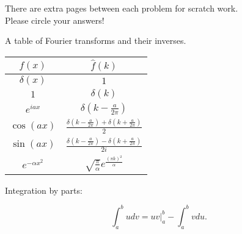 \documentclass[12pt]{amsbook}
\begin{document}
\vspace*{4cm}


\begin{center}\large{There are extra pages between each problem for scratch work.\\

Please circle your answers!}\end{center}

\newpage
\begin{center}\large{A table of Fourier transforms and their inverses.} \end{center}
\begin{table}[H]
        \centering
        \renewcommand{\arraystretch}{2}
        \begin{tabular}{c|c}
            $f(x)$ & $\hat{f}(k)$\\
            \hline
         	$\delta(x)$ & $1$\\
         	$1$ & $\delta(k)$\\
         	$e^{iax}$ & $\delta\left(k-\frac{a}{2\pi}\right)$\\
         	$\cos(ax)$ & $\frac{\delta\left(k-\frac{a}{2\pi}\right)+\delta\left(k+\frac{a}{2\pi}\right)}{2}$\\
     		$\sin(ax)$ & $\frac{\delta\left(k-\frac{a}{2\pi}\right)-\delta\left(k+\frac{a}{2\pi}\right)}{2i}$\\
     		$e^{-\alpha x^2}$ & $\sqrt{\frac{\pi}{\alpha}} e^{\frac{(\pi k)^2}{\alpha}}$
        \end{tabular}
        \label{tab:fourier_transform}
    \end{table}
    
   \vspace*{2cm}
\begin{center}\large{Integration by parts:}\end{center}

 	\[
 	\int_a^b udv = \left. uv \right\vert_a^b - \int_a^b vdu.
 	\]
\end{document}
